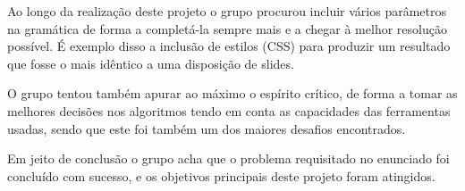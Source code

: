 \documentclass[11pt,a4paper]{report}
\begin{document}
Ao longo da realização deste projeto o grupo procurou incluir vários parâmetros na gramática de forma a completá-la sempre mais e a chegar à melhor resolução possível. É exemplo disso a inclusão de estilos (CSS) para produzir um resultado que fosse o mais idêntico a uma disposição de slides.

O grupo tentou também apurar ao máximo o espírito crítico, de forma a tomar as melhores decisões nos algoritmos tendo em conta as capacidades das ferramentas usadas, sendo que este foi também um dos maiores desafios encontrados.

Em jeito de conclusão o grupo acha que o problema requisitado no enunciado foi concluído com sucesso, e os objetivos principais deste projeto foram atingidos.
\end{document}
